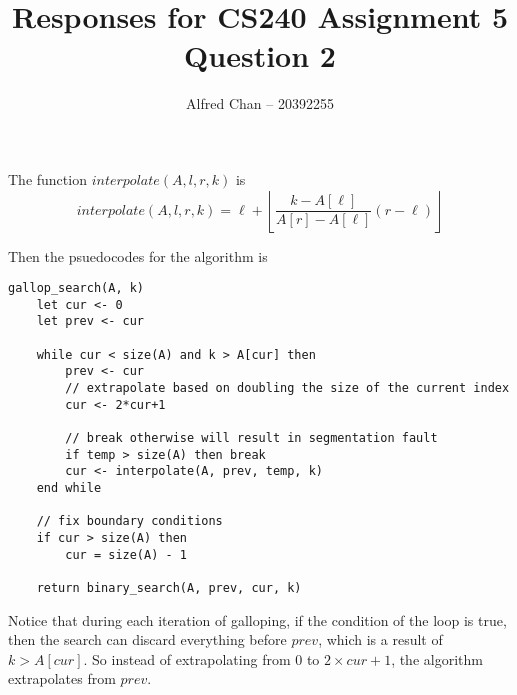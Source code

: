 \documentclass[12pt]{article}
\title{Responses for CS240 Assignment 5 Question 2}
\author{Alfred Chan -- 20392255}
\begin{document}
\maketitle

The function $interpolate(A, l, r, k)$ is
\begin{equation}
interpolate(A, l, r, k) = \ell+\left\lfloor\frac{k-A[\ell]}{A[r]-A[\ell]}(r-\ell)\right\rfloor
\end{equation}

Then the psuedocodes for the algorithm is
\begin{lstlisting}
gallop_search(A, k)
	let cur <- 0
	let prev <- cur

	while cur < size(A) and k > A[cur] then
		prev <- cur
		// extrapolate based on doubling the size of the current index
		cur <- 2*cur+1

		// break otherwise will result in segmentation fault
		if temp > size(A) then break
		cur <- interpolate(A, prev, temp, k)
	end while

	// fix boundary conditions
	if cur > size(A) then
		cur = size(A) - 1

	return binary_search(A, prev, cur, k)
\end{lstlisting}

Notice that during each iteration of galloping, if the condition of the loop is true, then the search can discard everything before $prev$, which is a result of $k > A[cur]$. So instead of extrapolating from 0 to $2 \times cur + 1$, the algorithm extrapolates from $prev$.
\done
\end{document}
